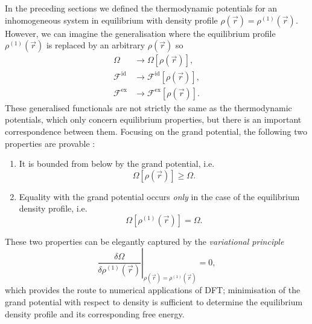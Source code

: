 In the preceding sections we defined the thermodynamic potentials for an inhomogeneous system in equilibrium with density profile $\rho(\vec{r}) = \rho^{(1)}(\vec{r})$.
However, we can imagine the generalisation where the equilibrium profile $\rho^{(1)}(\vec{r})$ is replaced by an arbitrary $\rho(\vec{r})$ so
\begin{align*}
  \Omega &\to \Omega[\rho(\vec{r})],
  \\
  \mathcal{F}^\mathrm{id} &\to \mathcal{F}^\mathrm{id}[\rho(\vec{r})],
  \\
  \mathcal{F}^\mathrm{ex} &\to \mathcal{F}^\mathrm{ex}[\rho(\vec{r})].
\end{align*}
These generalised functionals are not strictly the same as the thermodynamic potentials, which only concern equilibrium properties, but there is an important correspondence between them.
Focusing on the grand potential, the following two properties are provable%
:
\begin{enumerate}
  \item It is bounded from below by the grand potential, i.e.\
    \begin{equation*}
      \Omega[\rho(\vec{r})] \ge \Omega.
    \end{equation*}
  \item Equality with the grand potential occurs \emph{only} in the case of the equilibrium density profile, i.e.\
    \begin{equation*}
      \Omega[\rho^{(1)}(\vec{r})] = \Omega.
    \end{equation*}
\end{enumerate}
These two properties can be elegantly captured by the \emph{variational principle}
\begin{equation}\label{eq:dft-equilibrium}
  \left.
  \frac{\delta \Omega}{\delta \rho^{(1)}(\vec{r})}
  \right|_{\rho(\vec{r}) = \rho^{(1)}(\vec{r})}
  =
  0,
\end{equation}
which provides the route to numerical applications of DFT; minimisation of the grand potential with respect to density is sufficient to determine the equilibrium density profile and its corresponding free energy.

